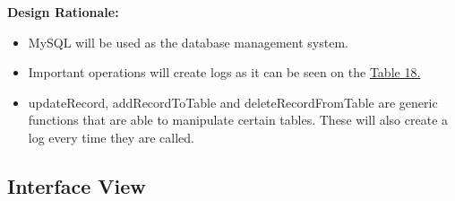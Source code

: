 \documentclass[11pt]{article}
\begin{document}
    \textbf{Design Rationale:\\}
    \begin{itemize}
        \item MySQL will be used as the database management system.
        \item Important operations will create logs as it can be seen on the \hyperref[CRUD]{Table 18.}
        \item updateRecord, addRecordToTable and deleteRecordFromTable are generic functions that are able to manipulate certain tables. These will also create a log every time they are called.
    \end{itemize}


    \subsection{Interface View}
\end{document}
